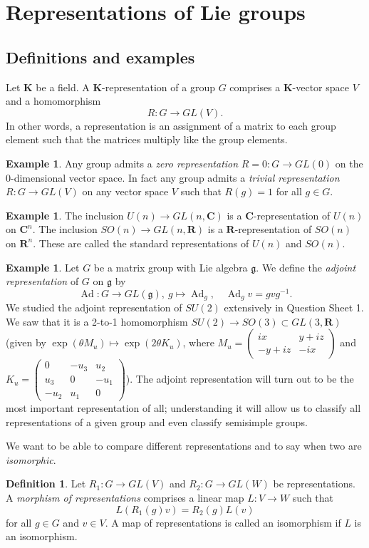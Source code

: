 \documentclass[12pt]{article}
\newcommand{\BB}{\mathbf}
\newcommand{\CC}{\mathbf{C}}
\newcommand{\RR}{\mathbf{R}}
\newcommand{\OP}{\operatorname}
\newcommand{\Ad}{\OP{Ad}}
\newcommand{\matr}[4]{\left(\begin{array}{cc}#1 & #2\\ #3 & #4\end{array}\right)}
\newcommand{\matt}[9]{\left(\begin{array}{ccc}#1 & #2 & #3\\#4 & #5 & #6\\#7 & #8 & #9\end{array}\right)}
\theoremstyle{definition}
\newtheorem{dfn}[thm]{Definition}
\newtheorem{exm}[thm]{Example}
\theoremstyle{check}
\theoremstyle{remark}
\theoremstyle{TheoremNum}
\begin{document}
\section{Representations of Lie groups}


\subsection{Definitions and examples}

Let $\BB{K}$ be a field. A $\BB{K}$-representation of a group $G$ comprises a $\BB{K}$-vector space $V$ and a homomorphism
\[R\colon G\to GL(V).\]
In other words, a representation is an assignment of a matrix to each group element such that the matrices multiply like the group elements.
\begin{exm}
Any group admits a {\em zero representation} $R=0\colon G\to GL(0)$ on the 0-dimensional vector space. In fact any group admits a {\em trivial representation} $R\colon G\to GL(V)$ on any vector space $V$ such that $R(g)=1$ for all $g\in G$.
\end{exm}
\begin{exm}
The inclusion $U(n)\to GL(n,\CC)$ is a $\CC$-representation of $U(n)$ on $\CC^n$. The inclusion $SO(n)\to GL(n,\RR)$ is a $\RR$-representation of $SO(n)$ on $\RR^n$. These are called the standard representations of $U(n)$ and $SO(n)$.
\end{exm}
\begin{exm}
Let $G$ be a matrix group with Lie algebra $\mathfrak{g}$. We define the {\em adjoint representation} of $G$ on $\mathfrak{g}$ by
\[\Ad\colon G\to GL(\mathfrak{g}),\ g\mapsto\Ad_g,\quad \Ad_gv=gvg^{-1}.\]
We studied the adjoint representation of $SU(2)$ extensively in Question Sheet 1. We saw that it is a 2-to-1 homomorphism $SU(2)\to SO(3)\subset GL(3,\RR)$ (given by $\exp(\theta M_u)\mapsto\exp(2\theta K_u)$, where $M_u=\matr{ix}{y+iz}{-y+iz}{-ix}$ and $K_u=\matt{0}{-u_3}{u_2}{u_3}{0}{-u_1}{-u_2}{u_1}{0}$). The adjoint representation will turn out to be the most important representation of all; understanding it will allow us to classify all representations of a given group and even classify semisimple groups.
\end{exm}

We want to be able to compare different representations and to say when two are {\em isomorphic}.
\begin{dfn}
Let $R_1\colon G\to GL(V)$ and $R_2\colon G\to GL(W)$ be representations. A {\em morphism of representations} comprises a linear map $L\colon V\to W$ such that
\[L\left(R_1(g)v\right)=R_2(g)L(v)\]
for all $g\in G$ and $v\in V$. A map of representations is called an isomorphism if $L$ is an isomorphism.
\end{dfn}
\end{document}

